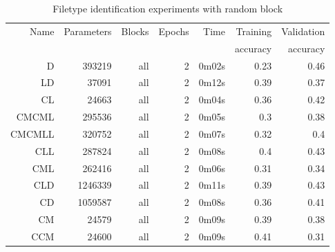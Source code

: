 \begin{table}[!ht]
    \centering
    \caption{Filetype identification experiments with random block}
    \label{tab:carving12-27}
\begin{tabular}{r|r|r|r|r|r|r}
\hline
Name & Parameters & Blocks & Epochs & Time    & Training          & Validation          \\       
     &            &        &        &         &          accuracy &            accuracy \\ \hline\hline

D      & 393219  & all & 2 & 0m02s & 0.23 & 0.46 \\ \hline
LD     & 37091   & all & 2 & 0m12s & 0.39 & 0.37 \\ \hline
CL     & 24663   & all & 2 & 0m04s & 0.36 & 0.42 \\ \hline
CMCML  & 295536  & all & 2 & 0m05s & 0.3  & 0.38 \\ \hline
CMCMLL & 320752  & all & 2 & 0m07s & 0.32 & 0.4  \\ \hline
CLL    & 287824  & all & 2 & 0m08s & 0.4  & 0.43 \\ \hline
CML    & 262416  & all & 2 & 0m06s & 0.31 & 0.34 \\ \hline
CLD    & 1246339 & all & 2 & 0m11s & 0.39 & 0.43 \\ \hline
CD     & 1059587 & all & 2 & 0m08s & 0.36 & 0.41 \\ \hline
CM     & 24579   & all & 2 & 0m09s & 0.39 & 0.38 \\ \hline
CCM    & 24600   & all & 2 & 0m09s & 0.41 & 0.31 \\ \hline
\end{tabular}
\end{table}